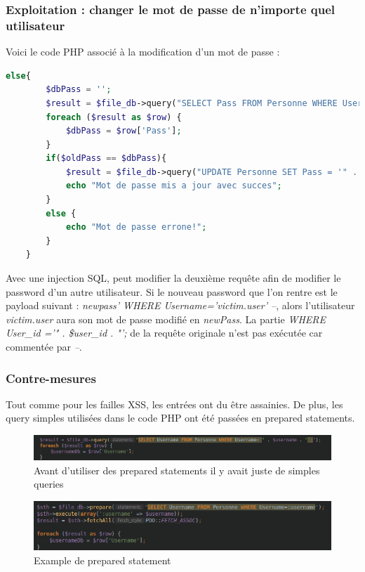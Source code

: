 \documentclass[12pt]{article}
\begin{document}
\subsubsection{Exploitation : changer le mot de passe de n'importe quel utilisateur}
Voici le code PHP associé à la modification d'un mot de passe : 
\begin{lstlisting}[language=PHP]
    else{
        $dbPass = '';
        $result = $file_db->query("SELECT Pass FROM Personne WHERE User_id ='" . $user_id . "';");
        foreach ($result as $row) {
            $dbPass = $row['Pass'];
        }
        if($oldPass == $dbPass){
            $result = $file_db->query("UPDATE Personne SET Pass = '" . $newPass . "' WHERE User_id ='" . $user_id . "';");
            echo "Mot de passe mis a jour avec succes";
        }
        else {
            echo "Mot de passe errone!";
        }
    }
\end{lstlisting}

Avec une injection SQL, peut modifier la deuxième requête afin de modifier le password d'un autre utilisateur. Si le nouveau password que l'on rentre est le payload suivant : \textit{newpass' WHERE Username='victim.user' --}, alors l'utilisateur \textit{victim.user} aura son mot de passe modifié en \textit{newPass}. La partie \textit{WHERE User\_id ='" . \$user\_id . "';} de la requête originale n'est pas exécutée car commentée par \textit{--}.

\subsubsection{Contre-mesures}
Tout comme pour les failles XSS, les entrées ont du être assainies. De plus, les query simples utilisées dans le code PHP ont été passées en prepared statements.

\begin{figure}[H]
\centering
\includegraphics[width=\linewidth]{images/simpleQuery.png}
\caption{Avant d'utiliser des prepared statements il y avait juste de simples queries}
\end{figure}

\begin{figure}[H]
\centering
\includegraphics[width=\linewidth]{images/preparedStatement.png}
\caption{Example de prepared statement}
\end{figure}
\end{document}
